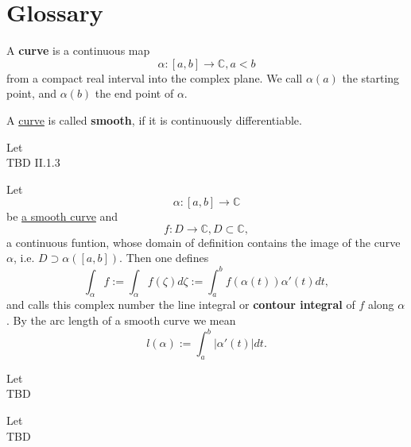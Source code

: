 \chapter{Glossary}


\begin{definition}[Curve (II.1.1)]
    \label{sec:Curve}
    A \textbf{curve} is a continuous map
    $$\alpha: [a,b] \rightarrow \mathbb{C}, a < b$$
    from a compact real interval into the complex plane. We call $\alpha(a)$ the starting point,
    and $\alpha(b)$ the end point of $\alpha$.
\end{definition}


\begin{definition}
    \label{sec:SmoothCurve}
    A \hyperref[sec:Curve]{curve} is called \textbf{smooth}, if it is continuously differentiable.
\end{definition}


\begin{definition}
    \label{sec:PiecewiseSmoothCurve}
    Let\\
    TBD II.1.3
\end{definition}


\begin{definition}
    \label{sec:ContourIntegral}
    Let
    $$\alpha : [a, b] \rightarrow \mathbb{C}$$
    be \hyperref[sec:SmoothCurve]{a smooth curve} and
    $$f: D \rightarrow \mathbb{C}, D \subset \mathbb{C},$$
    a continuous funtion, whose domain of definition contains the image of the curve $\alpha$,
    i.e. $D \supset \alpha([a,b]).$ Then one defines
    $$ \int_\alpha f:= \int_\alpha f(\zeta) d\zeta := \int_a^b f(\alpha(t))\alpha'(t)dt,$$
    and calls this complex number the line integral or \textbf{contour integral} of $f$ along $\alpha$.
    By the arc length of a smooth curve we mean
    $$l(\alpha):=\int_a^b |\alpha'(t)|dt.$$
\end{definition}


\begin{definition}
    \label{sec:PropContourIntegral}
    Let\\
    TBD
\end{definition}


\begin{definition}
    \label{sec:ArcwiseConnected}
    Let\\
    TBD
\end{definition}


